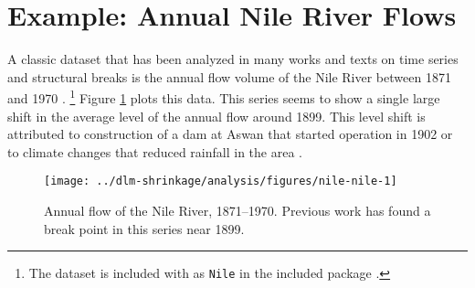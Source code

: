 


\section{Example: Annual Nile River Flows}
\label{dlm:sec:nile}

A classic dataset that has been analyzed in many works and texts on time series and structural breaks is the annual flow volume of the Nile River between 1871 and 1970 \parencites{Cobb1978}{Balke1993}{DeJongPenzer1998}{}{DurbinKoopman2012}{CommandeurKoopmanOoms2011}.%
\footnote{The dataset is included with \RLang{} as \texttt{Nile} in the included package .}
Figure \ref{dlm:fig:nile} plots this data.
This series seems to show a single large shift in the average level of the annual flow around 1899.
This level shift is attributed to construction of a dam at Aswan that started operation in 1902 or to climate changes that reduced rainfall in the area \parencite[278]{Cobb1978}.

\begin{figure}
  \centering
  \texttt{[image: ../dlm-shrinkage/analysis/figures/nile-nile-1]}
  \caption[Annual flow of the Nile River, 1871--1970]{Annual flow of the Nile River, 1871--1970. Previous work has found a break point in this series near 1899.}
  \label{dlm:fig:nile}
\end{figure}

